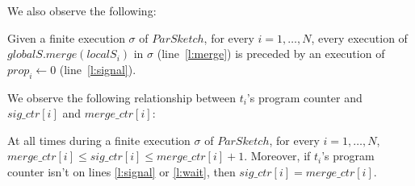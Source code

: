 We also observe the following:
\begin{observation}
    Given a finite execution $\sigma$ of $ParSketch$, for every $i=1,\dots,N$, every execution
    of $globalS.merge(localS_i)$ in $\sigma$ (line~\ref{l:merge}) is preceded by an execution of $prop_i \leftarrow 0$
    (line~\ref{l:signal}).
\end{observation}

We observe the following relationship between $t_i$'s program counter and $sig\_ctr[i]$ and \linebreak
$merge\_ctr[i]$:
\begin{observation}
    At all times during a finite execution $\sigma$ of $ParSketch$, for every
    $i=1,\dots,N$, $merge\_ctr[i] \leq sig\_ctr[i] \leq merge\_ctr[i] + 1$.
    Moreover, if $t_i$'s program counter isn't on lines \ref{l:signal} or \ref{l:wait}, then $sig\_ctr[i]=merge\_ctr[i]$.
    \label{obs:counter_relationship}
\end{observation}

